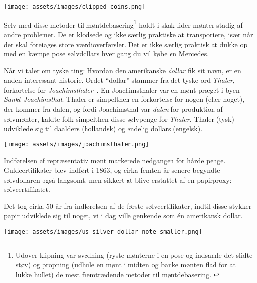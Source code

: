 \begin{center}
  \texttt{[image: assets/images/clipped-coins.png]}
  \label{fig:clipped-coins}
\end{center}

Selv med disse metoder til møntdebasering\footnote{Udover klipning var svedning
(ryste mønterne i en pose og indsamle det slidte støv) og propning
(udhule en mønt i midten og banke mønten flad for at lukke hullet)
de mest fremtrædende metoder til møntdebasering. \cite{wiki:coin-debasement}}
holdt i skak lider mønter stadig af andre problemer. De er klodsede og ikke særlig
praktiske at transportere, især når der skal foretages store værdioverførsler.
Det er ikke særlig praktisk at dukke op med en kæmpe pose sølvdollars hver gang
du vil købe en Mercedes.

Når vi taler om tyske ting: Hvordan den amerikanske \textit{dollar} fik sit navn,
er en anden interessant historie. Ordet \enquote{dollar} stammer fra det tyske ord
\textit{Thaler}, forkortelse for \textit{Joachimsthaler}~\cite{wiki:thaler}. En
Joachimsthaler var en mønt præget i byen \textit{Sankt Joachimsthal}.
Thaler er simpelthen en forkortelse for nogen (eller noget), der kommer fra dalen,
og fordi Joachimsthal var \textit{dalen} for produktion af sølvmønter,
kaldte folk simpelthen disse sølvpenge for \textit{Thaler.} Thaler (tysk)
udviklede sig til daalders (hollandsk) og endelig dollars (engelsk).


\begin{center}
  \centering
  \texttt{[image: assets/images/joachimsthaler.png]}
  \label{fig:joachimsthaler}
\end{center}

Indførelsen af repræsentativ mønt markerede nedgangen for hårde
penge. Guldcertifikater blev indført i 1863, og cirka femten
år senere begyndte sølvdollaren også langsomt, men sikkert at blive
erstattet af en papirproxy: sølvcertifikatet. \cite{wiki:silver-certificate}

Det tog cirka 50 år fra indførelsen af de første sølvcertifikater, indtil
disse stykker papir udviklede sig til noget, vi i dag ville genkende som én
amerikansk dollar.

\begin{center}
  \centering
  \texttt{[image: assets/images/us-silver-dollar-note-smaller.png]}
  \label{fig:us-silver-dollar-note-smaller}
\end{center}


